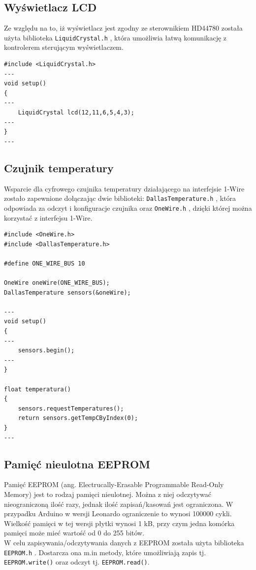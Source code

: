 \subsection{Wyświetlacz LCD}

Ze względu na to, iż wyświetlacz jest zgodny ze sterownikiem HD44780 została użyta biblioteka \texttt{LiquidCrystal.h} \cite{lib_lcd}, która umożliwia łatwą komunikację z kontrolerem sterującym wyświetlaczem.

\begin{lstlisting}[label=list:lcd_setup,caption=Inicjalizacja wyświetlacza,
basicstyle=\footnotesize\ttfamily]
#include <LiquidCrystal.h>
---
void setup()
{
---
    LiquidCrystal lcd(12,11,6,5,4,3);
---
}
---
\end{lstlisting}

\subsection{Czujnik temperatury} \label{one_wire_temp}

Wsparcie dla cyfrowego czujnika temperatury działającego na interfejsie 1-Wire zostało zapewnione dołączając dwie biblioteki: \texttt{DallasTemperature.h} \cite{lib_dallas}, która odpowiada za odczyt i konfiguracje czujnika oraz \texttt{OneWire.h} \cite{lib_onewire}, dzięki której można korzystać z interfejsu 1-Wire.

\begin{lstlisting}[label=list:d18s20_setup,caption=Inicjalizacja czujnika i odczyt temperatury,
basicstyle=\footnotesize\ttfamily]
#include <OneWire.h>
#include <DallasTemperature.h>

#define ONE_WIRE_BUS 10

OneWire oneWire(ONE_WIRE_BUS);
DallasTemperature sensors(&oneWire);

---
void setup()
{
---
    sensors.begin();
---
}

float temperatura() 
{
    sensors.requestTemperatures();
    return sensors.getTempCByIndex(0);
}
---
\end{lstlisting}


\subsection{Pamięć nieulotna EEPROM}
Pamięć EEPROM (ang. Electrucally-Erasable Programmable Read-Only Memory) jest to rodzaj pamięci nieulotnej. Można z niej odczytywać nieograniczoną ilość razy, jednak ilość zapisań/kasowań jest ograniczona. W przypadku Arduino w wersji Leonardo ograniczenie to wynosi 100000 cykli. Wielkość pamięci w tej wersji płytki wynosi 1 kB, przy czym jedna komórka pamięci może mieć wartość od 0 do 255 bitów.\\
W celu zapisywania/odczytywania danych z EEPROM została użyta biblioteka \texttt{EEPROM.h} \cite{lib_eeprom}. Dostarcza ona m.in metody, które umożliwiają zapis tj. \texttt{EEPROM.write()} oraz odczyt tj. \texttt{EEPROM.read()}.
